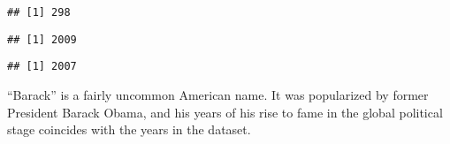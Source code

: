 \documentclass[]{article}
\newenvironment{Shaded}{\begin{snugshade}}{\end{snugshade}}
\newcommand{\CommentTok}[1]{\textcolor[rgb]{0.56,0.35,0.01}{\textit{#1}}}
\newcommand{\DecValTok}[1]{\textcolor[rgb]{0.00,0.00,0.81}{#1}}
\newcommand{\KeywordTok}[1]{\textcolor[rgb]{0.13,0.29,0.53}{\textbf{#1}}}
\newcommand{\NormalTok}[1]{#1}
\newcommand{\OperatorTok}[1]{\textcolor[rgb]{0.81,0.36,0.00}{\textbf{#1}}}
\newcommand{\StringTok}[1]{\textcolor[rgb]{0.31,0.60,0.02}{#1}}
\begin{document}
\begin{verbatim}
## [1] 298
\end{verbatim}

\begin{Shaded}
\end{Shaded}

\begin{verbatim}
## [1] 2009
\end{verbatim}

\begin{Shaded}
\end{Shaded}

\begin{verbatim}
## [1] 2007
\end{verbatim}

``Barack'' is a fairly uncommon American name. It was popularized by
former President Barack Obama, and his years of his rise to fame in the
global political stage coincides with the years in the dataset.
\end{document}
